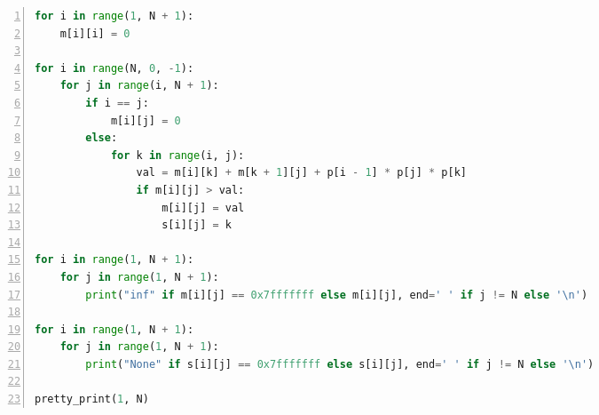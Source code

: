 \documentclass[a4paper,twoside]{article}
\begin{document}
\begin{spacing}{1.2}
\begin{lstlisting}[language=Python,numbers=left,style=PythonStyle,caption=矩阵连乘,label={code:implmat}]
for i in range(1, N + 1):
    m[i][i] = 0

for i in range(N, 0, -1):
    for j in range(i, N + 1):
        if i == j:
            m[i][j] = 0
        else:
            for k in range(i, j):
                val = m[i][k] + m[k + 1][j] + p[i - 1] * p[j] * p[k]
                if m[i][j] > val:
                    m[i][j] = val
                    s[i][j] = k

for i in range(1, N + 1):
    for j in range(1, N + 1):
        print("inf" if m[i][j] == 0x7fffffff else m[i][j], end=' ' if j != N else '\n')

for i in range(1, N + 1):
    for j in range(1, N + 1):
        print("None" if s[i][j] == 0x7fffffff else s[i][j], end=' ' if j != N else '\n')

pretty_print(1, N)

\end{lstlisting}

\end{spacing}
\end{document}
